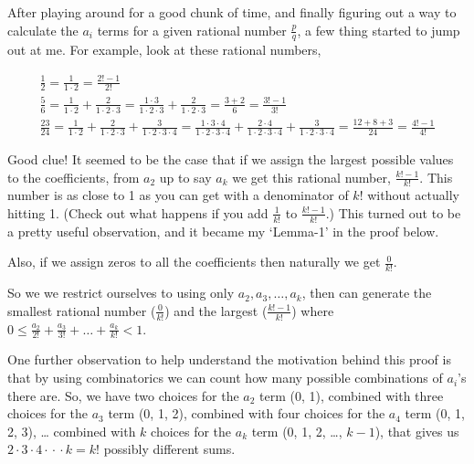 \documentclass{article}
\begin{document}
After playing around for a good chunk of time, and finally figuring out
a way to calculate the \(a_i\) terms
for a given rational number \(\frac{p}{q}\), a few thing started to jump out at me.
For example, look at these rational numbers,

{\small
\bgroup
\setlength{\abovedisplayskip}{0pt}
\setlength{\belowdisplayskip}{0pt}
\begin{gather*}
\frac{1}{2}
= \frac{1}{1\cdot{}2}
= \frac{2!-1}{2!}\\
\frac{5}{6}
= \frac{1}{1\cdot{}2}
+ \frac{2}{1\cdot{}2\cdot{}3}
= \frac{1\cdot{}3}{1\cdot{}2\cdot{}3}
+ \frac{2}{1\cdot{}2\cdot{}3}
= \frac{3+2}{6}
= \frac{3!-1}{3!}\\
\frac{23}{24}
= \frac{1}{1\cdot{}2}
+ \frac{2}{1\cdot{}2\cdot{}3}
+ \frac{3}{1\cdot{}2\cdot{}3\cdot{}4}
= \frac{1\cdot{}3\cdot{}4}{1\cdot{}2\cdot{}3\cdot{}4}
+ \frac{2\cdot{}4}{1\cdot{}2\cdot{}3\cdot{}4}
+ \frac{3}{1\cdot{}2\cdot{}3\cdot{}4}
= \frac{12+8+3}{24}
= \frac{4!-1}{4!}
\end{gather*}
\egroup
}

Good clue! It seemed to be the case
that if we assign the largest possible values to the coefficients,
from \(a_2\) up to say \(a_k\) we get this rational number, \(\frac{k!-1}{k!}\).
This number is as close to 1 as you can get with a denominator of \(k!\) without actually
hitting 1. (Check out what happens if you add \(\frac{1}{k!}\) to \(\frac{k!-1}{k!}\).)
This turned out to be
a pretty useful observation, and it became my `Lemma-1' in the proof below.

Also, if we assign zeros to all the coefficients then naturally we get \(\frac{0}{k!}\).

So we we restrict ourselves to using only \(a_2, a_3, \dots{}, a_k\), then
can generate the smallest rational number (\(\frac{0}{k!}\)) and the largest
(\(\frac{k!-1}{k!}\)) where
\(0 \le{} \frac{a_2}{2!} + \frac{a_3}{3!} + \dots{} + \frac{a_k}{k!} < 1\).

One further observation to help understand the motivation
behind this proof is that by using combinatorics we can
count how many possible combinations of \(a_i\)'s there are.
So, we have two choices for the \(a_2\) term (0, 1), combined with three choices for the \(a_3\) term (0, 1, 2),
combined with four choices for the \(a_4\) term (0, 1, 2, 3), \dots{} combined with \(k\) choices for
the \(a_k\) term (0, 1, 2, \dots{}, \(k\!-\!1\)), that
gives us \(2\cdot{}3\cdot{}4\cdot{}\cdot{}\cdot{}k = k!\) possibly different sums.
\end{document}
